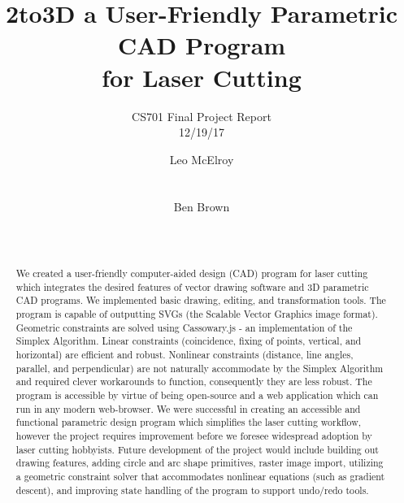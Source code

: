 \documentclass{sig-alternate-05-2015}
\begin{document}
\title{2to3D a User-Friendly Parametric CAD Program\\for Laser Cutting}
\subtitle{CS701 Final Project Report \\ 12/19/17}


\author{
%
\alignauthor
Leo McElroy\\
       \\
       \\
\alignauthor
Ben Brown\\
       \\
       \\
}

\maketitle

\begin{abstract}

We created a user-friendly computer-aided design (CAD) program for laser cutting which integrates the desired features of vector drawing software and 3D parametric CAD programs. We implemented basic drawing, editing, and transformation tools. The program is capable of outputting SVGs (the Scalable Vector Graphics image format). Geometric constraints are solved using Cassowary.js - an implementation of the Simplex Algorithm. Linear constraints (coincidence, fixing of points, vertical, and horizontal) are efficient and robust. Nonlinear constraints (distance, line angles, parallel, and perpendicular) are not naturally accommodate by the Simplex Algorithm and required clever workarounds to function, consequently they are less robust. The program is accessible by virtue of being open-source and a web application which can run in any modern web-browser. We were successful in creating an accessible and functional parametric design program which simplifies the laser cutting workflow, however the project requires improvement before we foresee widespread adoption by laser cutting hobbyists. Future development of the project would include building out drawing features, adding circle and arc shape primitives, raster image import, utilizing a geometric constraint solver that accommodates nonlinear equations (such as gradient descent), and improving state handling of the program to support undo/redo tools.

\end{abstract}
\end{document}
